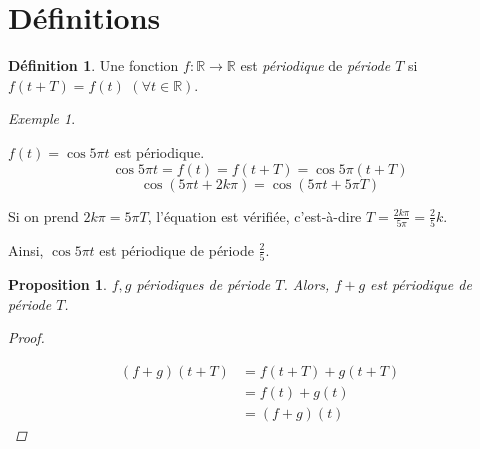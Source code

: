 \documentclass{report}
\newcommand*{\reels}{\mathbb{R}}
\newtheorem*{prop}{Proposition}
\theoremstyle{definition}
\newtheorem*{defin}{D\'efinition}
\theoremstyle{remark}
\newtheorem*{exem}{Exemple}
\begin{document}
	\section{D\'efinitions}
	\begin{defin}
		Une fonction $f:\reels\to\reels$ est \emph{p\'eriodique} de \emph{p\'eriode $T$} si $f(t+T)=f(t)$ $(\forall t \in \reels)$.
		\begin{exem}~

			$f(t)=\cos 5 \pi t$ est p\'eriodique.
			\begin{equation*}
				\cos 5\pi t = f(t) = f(t+T) = \cos 5\pi (t+T)
			\end{equation*}
			\begin{equation*}
				\cos(5\pi t+2k\pi) = \cos(5\pi t+5\pi T)
			\end{equation*}

			Si on prend $2k\pi=5\pi T$, l'\'equation est v\'erifi\'ee, c'est-\`a-dire $T=\frac{2k\pi}{5\pi} = \frac{2}{5}k$.

			Ainsi, $\cos 5\pi t$ est p\'eriodique de p\'eriode $\frac{2}{5}$.
		\end{exem}
	\end{defin}
	\begin{prop}
		$f,g$ p\'eriodiques de p\'eriode $T$. Alors, $f+g$ est p\'eriodique de p\'eriode $T$.
		\begin{proof}~

			\begin{align*}
				(f+g)(t+T)&= f(t+T)+g(t+T)\\
				&= f(t)+g(t)\\
				&= (f+g)(t)
			\end{align*}
		\end{proof}
	\end{prop}
\end{document}
